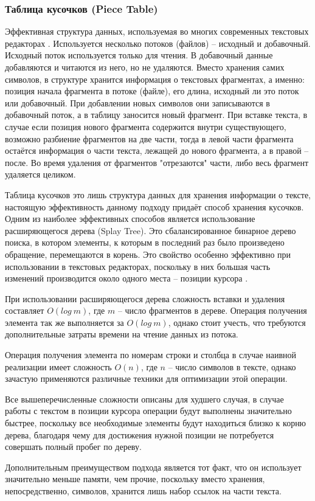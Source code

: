 \documentclass{fefu}
\begin{document}
			\subsubsection{Таблица кусочков (Piece Table)}
				\par Эффективная структура данных, используемая во многих современных 
				текстовых редакторах \cite{PieceTableArticle}. Используется несколько потоков
				(файлов) -- исходный и добавочный. Исходный поток используется только для 
				чтения. В добавочный данные добавляются и читаются из него, но не удаляются.
				Вместо хранения самих символов, в структуре хранится информация о текстовых 
				фрагментах, а именно: позиция начала фрагмента в потоке (файле), его длина, 
				исходный ли это поток или добавочный. При добавлении новых символов они
				записываются в добавочный поток, а в таблицу заносится новый фрагмент. При
				вставке текста, в случае если позиция нового фрагмента содержится внутри
				существующего, возможно разбиение фрагментов на две части, тогда в левой части
				фрагмента остаётся информация о части текста, лежащей до нового фрагмента, а в 
				правой -- после. Во время удаления от фрагментов "отрезаются" части, либо весь
				фрагмент удаляется целиком.
				\par Таблица кусочков это лишь структура данных для хранения информации о
				тексте, настоящую эффективность данному подходу придаёт способ хранения
				кусочков. Одним из наиболее эффективных способов является использование 
				расширяющегося дерева (Splay Tree). Это сбалансированное бинарное дерево 
				поиска, в котором элементы, к которым в последний раз было произведено
				обращение, перемещаются в корень. Это свойство особенно эффективно при
				использовании в текстовых редакторах, поскольку в них большая часть изменений
				производится около одного места -- позиции курсора \cite{SplayTreeArticle}.
				\par При использовании расширяющегося дерева сложность вставки и удаления
				составляет $O(log~m)$, где $m$ -- число фрагментов в дереве. Операция получения
				элемента так же выполняется за $O(log~m)$, однако стоит учесть, что
				требуются дополнительные затраты времени на чтение данных из потока.
				\par Операция получения элемента по номерам строки и столбца в случае наивной
				реализации имеет сложность $O(n)$, где $n$ -- число символов в тексте, однако
				зачастую применяются различные техники для оптимизации этой операции.
				\par Все вышеперечисленные сложности описаны для худшего случая, в случае
				работы с текстом в позиции курсора операции будут выполнены значительно 
				быстрее, поскольку все необходимые элементы будут находиться близко к корню
				дерева, благодаря чему для достижения нужной позиции не потребуется совершать
				полный пробег по дереву.
				\par Дополнительным преимуществом подхода является тот факт, что он
				использует значительно меньше памяти, чем прочие, поскольку вместо хранения,
				непосредственно, символов, хранится лишь набор ссылок на части текста.
\end{document}

